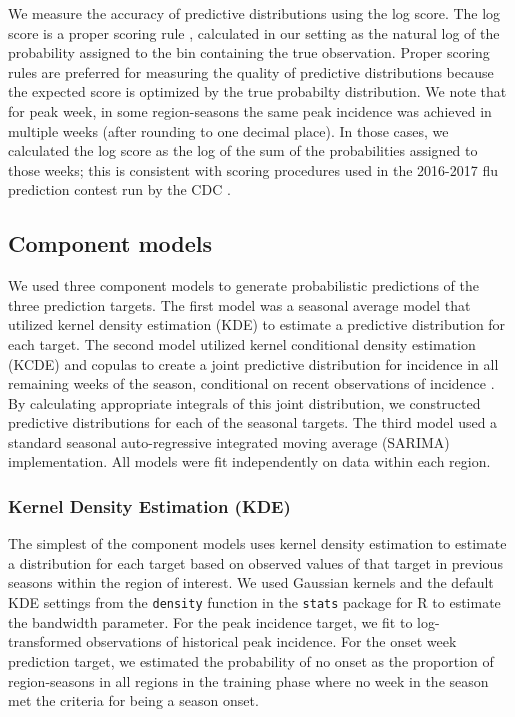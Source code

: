 \documentclass[10pt,letterpaper]{article}
\begin{document}
We measure the accuracy of predictive distributions using the log score.
The log score is a proper scoring rule \cite{Gneiting2007}, calculated
in our setting as the natural log of the probability assigned to the bin
containing the true observation. Proper scoring rules are preferred for
measuring the quality of predictive distributions because the expected
score is optimized by the true probabilty distribution. We note that for
peak week, in some region-seasons the same peak incidence was achieved
in multiple weeks (after rounding to one decimal place). In those cases,
we calculated the log score as the log of the sum of the probabilities
assigned to those weeks; this is consistent with scoring procedures used
in the 2016-2017 flu prediction contest run by the CDC
\cite{cdc2016-contest-guidelines}.

\subsection{Component models}\label{component-models}

We used three component models to generate probabilistic predictions of
the three prediction targets. The first model was a seasonal average
model that utilized kernel density estimation (KDE) to estimate a
predictive distribution for each target. The second model utilized
kernel conditional density estimation (KCDE) and copulas to create a
joint predictive distribution for incidence in all remaining weeks of
the season, conditional on recent observations of incidence
\cite{ReichLabGitHubDiseasePredWithKCDEPackage}. By calculating
appropriate integrals of this joint distribution, we constructed
predictive distributions for each of the seasonal targets. The third
model used a standard seasonal auto-regressive integrated moving average
(SARIMA) implementation. All models were fit independently on data
within each region.

\subsubsection{Kernel Density Estimation
(KDE)}\label{kernel-density-estimation-kde}

The simplest of the component models uses kernel density estimation
\cite{silverman1986density} to estimate a distribution for each target
based on observed values of that target in previous seasons within the
region of interest. We used Gaussian kernels and the default KDE
settings from the \texttt{density} function in the \texttt{stats}
package for R \cite{Rcore2015} to estimate the bandwidth parameter. For
the peak incidence target, we fit to log-transformed observations of
historical peak incidence. For the onset week prediction target, we
estimated the probability of no onset as the proportion of
region-seasons in all regions in the training phase where no week in the
season met the criteria for being a season onset.
\end{document}
